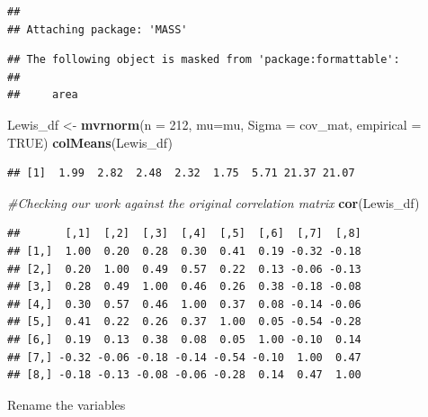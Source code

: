 \documentclass[
  11pt,
]{book}
\newenvironment{Shaded}{\begin{snugshade}}{\end{snugshade}}
\newcommand{\AttributeTok}[1]{\textcolor[rgb]{0.27,0.27,0.27}{#1}}
\newcommand{\CommentTok}[1]{\textcolor[rgb]{0.37,0.37,0.37}{\textit{#1}}}
\newcommand{\ConstantTok}[1]{\textcolor[rgb]{0.37,0.37,0.37}{#1}}
\newcommand{\DecValTok}[1]{\textcolor[rgb]{0.06,0.06,0.06}{#1}}
\newcommand{\FunctionTok}[1]{\textcolor[rgb]{0.27,0.27,0.27}{\textbf{#1}}}
\newcommand{\NormalTok}[1]{#1}
\newcommand{\OtherTok}[1]{\textcolor[rgb]{0.37,0.37,0.37}{#1}}
\begin{document}
\begin{verbatim}
## 
## Attaching package: 'MASS'
\end{verbatim}

\begin{verbatim}
## The following object is masked from 'package:formattable':
## 
##     area
\end{verbatim}

\begin{Shaded}
\begin{Highlighting}[]
\NormalTok{Lewis\_df }\OtherTok{\textless{}{-}} \FunctionTok{mvrnorm}\NormalTok{(}\AttributeTok{n =} \DecValTok{212}\NormalTok{, }\AttributeTok{mu=}\NormalTok{mu, }\AttributeTok{Sigma =}\NormalTok{ cov\_mat, }\AttributeTok{empirical =} \ConstantTok{TRUE}\NormalTok{)}
\FunctionTok{colMeans}\NormalTok{(Lewis\_df)}
\end{Highlighting}
\end{Shaded}

\begin{verbatim}
## [1]  1.99  2.82  2.48  2.32  1.75  5.71 21.37 21.07
\end{verbatim}

\begin{Shaded}
\begin{Highlighting}[]
\CommentTok{\#Checking our work against the original correlation matrix}
\FunctionTok{cor}\NormalTok{(Lewis\_df)}
\end{Highlighting}
\end{Shaded}

\begin{verbatim}
##       [,1]  [,2]  [,3]  [,4]  [,5]  [,6]  [,7]  [,8]
## [1,]  1.00  0.20  0.28  0.30  0.41  0.19 -0.32 -0.18
## [2,]  0.20  1.00  0.49  0.57  0.22  0.13 -0.06 -0.13
## [3,]  0.28  0.49  1.00  0.46  0.26  0.38 -0.18 -0.08
## [4,]  0.30  0.57  0.46  1.00  0.37  0.08 -0.14 -0.06
## [5,]  0.41  0.22  0.26  0.37  1.00  0.05 -0.54 -0.28
## [6,]  0.19  0.13  0.38  0.08  0.05  1.00 -0.10  0.14
## [7,] -0.32 -0.06 -0.18 -0.14 -0.54 -0.10  1.00  0.47
## [8,] -0.18 -0.13 -0.08 -0.06 -0.28  0.14  0.47  1.00
\end{verbatim}

Rename the variables
\end{document}
